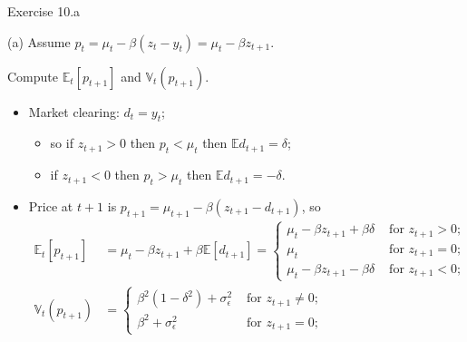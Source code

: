 \documentclass[english,10pt
,aspectratio=169
]{beamer}
\begin{document}
\begin{frame}{Exercise 10.a}
	\begin{exampleblock}{}
		(a) Assume $p_t = \mu_t - \beta(z_t - y_t) = \mu_t - \beta z_{t+1}$. 
		
		Compute $\mathbb{E}_t[p_{t+1}]$ and $\mathbb{V}_t(p_{t+1})$.
	\end{exampleblock}
	\pause
	\begin{itemize}
		\item Market clearing: $d_t = y_t$;
		\begin{itemize}
			\item so if $z_{t+1} > 0$ then $p_t < \mu_t$ then $\mathbb{E}d_{t+1} = \delta$;
			\item if $z_{t+1} < 0$ then $p_t > \mu_t$ then $\mathbb{E}d_{t+1} = -\delta$.
		\end{itemize}
		\item Price at $t+1$ is $p_{t+1} = \mu_{t+1} - \beta(z_{t+1} - d_{t+1})$, so
		\begin{align*}
			\mathbb{E}_t [p_{t+1}] &= \mu_t - \beta z_{t+1} + \beta \mathbb{E} [d_{t+1}] = 
			\begin{cases}
				\mu_t - \beta z_{t+1} + \beta \delta & \text{ for } z_{t+1} > 0;
				\\
				\mu_t & \text{ for } z_{t+1} = 0;
				\\
				\mu_t - \beta z_{t+1} - \beta \delta & \text{ for } z_{t+1} < 0;
			\end{cases}
			\\
			\mathbb{V}_t (p_{t+1}) &= 
			\begin{cases}
				\beta^2 (1-\delta^2) + \sigma_\epsilon^2 & \text{ for } z_{t+1} \neq 0;
				\\
				\beta^2 + \sigma_\epsilon^2 & \text{ for } z_{t+1} = 0;
			\end{cases}
		\end{align*}
	\end{itemize}
\end{frame}
\end{document}
